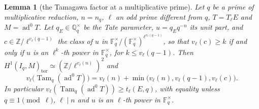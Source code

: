 \documentclass[11pt]{amsart}
\newtheorem{lemma}[theorem]{Lemma}
\theoremstyle{definition}
\newcommand{\Q}{\mathbb{Q}}
\newcommand{\Z}{\mathbb{Z}}
\newcommand{\F}{\mathbb{F}}
\newcommand{\ad}{\operatorname{ad}^0}
\newcommand{\Tam}{\operatorname{Tam}}
\begin{document}
\begin{lemma}[the Tamagawa factor at a multiplicative prime]\label{lem:tamfactor}
Let $q$ be a prime of multiplicative reduction, $n=n_q$, $\ell$ an odd prime different from $q$, $T=T_\ell E$ and $M=\ad T$. Let $q_E\in\Q_q^\times$ be the Tate parameter, $u=q_Eq^{-n}$ its unit part, and $c\in\Z/\ell^{v_\ell(q-1)}$ the class of $u$ in $\F_q^\times/(\F_q^\times)^{\ell^{v_\ell(q-1)}}$, so that $v_\ell(c)\ge k$ if and only if $u$ is an $\ell^k$-th power in $\F_q^\times$, for $k\le v_\ell(q-1)$. Then $H^1(I_q,M)_{\mathrm{tor}}\simeq(\Z/\ell^{v_\ell(n)})^2$ and
\[
v_\ell\bigl(\Tam_q(\ad T)\bigr)=v_\ell(n)+\min\bigl(v_\ell(n),v_\ell(q-1),v_\ell(c)\bigr).
\]
In particular $v_\ell(\Tam_q(\ad T))\ge t_\ell(E,q)$, with equality unless $q\equiv1\pmod\ell$, $\ell\mid n$ and $u$ is an $\ell$-th power in $\F_q^\times$.
\end{lemma}
\end{document}
